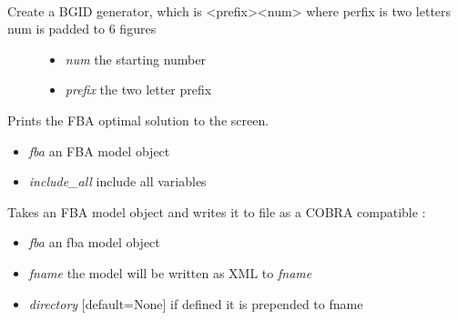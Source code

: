 \documentclass[a4paper,11pt,english]{sphinxmanual}
\begin{document}
\begin{fulllineitems}
\label{modules_doc:cbmpy.CBWrite.generateBGID}~\begin{description}
\item[{Create a BGID generator, which is \textless{}prefix\textgreater{}\textless{}num\textgreater{} where perfix is two letters num is padded to 6 figures}] \leavevmode\begin{itemize}
\item {} 
\emph{num} the starting number

\item {} 
\emph{prefix} the two letter prefix

\end{itemize}

\end{description}

\end{fulllineitems}


\begin{fulllineitems}
\label{modules_doc:cbmpy.CBWrite.printFBASolution}
Prints the FBA optimal solution to the screen.
\begin{itemize}
\item {} 
\emph{fba} an FBA model object

\item {} 
\emph{include\_all} include all variables

\end{itemize}

\end{fulllineitems}


\begin{fulllineitems}
\label{modules_doc:cbmpy.CBWrite.writeCOBRASBML}
Takes an FBA model object and writes it to file as a COBRA compatible :
\begin{itemize}
\item {} 
\emph{fba} an fba model object

\item {} 
\emph{fname} the model will be written as XML to \emph{fname}

\item {} 
\emph{directory} {[}default=None{]} if defined it is prepended to fname

\end{itemize}

\end{fulllineitems}
\end{document}
